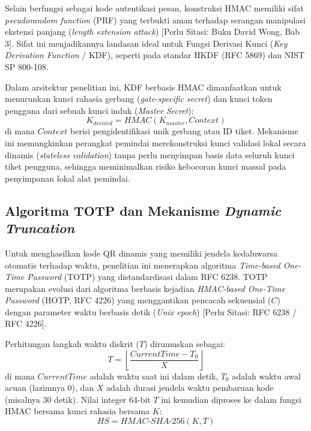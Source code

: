 Selain berfungsi sebagai kode autentikasi pesan, konstruksi HMAC memiliki sifat \textit{pseudorandom function} (PRF) yang terbukti aman terhadap serangan manipulasi ekstensi panjang (\textit{length extension attack}) [Perlu Sitasi: Buku David Wong, Bab 3]. Sifat ini menjadikannya landasan ideal untuk Fungsi Derivasi Kunci (\textit{Key Derivation Function} / KDF), seperti pada standar HKDF (RFC 5869) dan NIST SP 800-108.

Dalam arsitektur penelitian ini, KDF berbasis HMAC dimanfaatkan untuk menurunkan kunci rahasia gerbang (\textit{gate-specific secret}) dan kunci token pengguna dari sebuah kunci induk (\textit{Master Secret}):
\begin{equation}
    K_{derived} = HMAC(K_{master}, Context)
\end{equation}
di mana $Context$ berisi pengidentifikasi unik gerbang atau ID tiket. Mekanisme ini memungkinkan perangkat pemindai merekonstruksi kunci validasi lokal secara dinamis (\textit{stateless validation}) tanpa perlu menyimpan basis data seluruh kunci tiket pengguna, sehingga meminimalkan risiko kebocoran kunci massal pada penyimpanan lokal alat pemindai.

\subsection{Algoritma TOTP dan Mekanisme \textit{Dynamic Truncation}}
Untuk menghasilkan kode QR dinamis yang memiliki jendela kedaluwarsa otomatis terhadap waktu, penelitian ini menerapkan algoritma \textit{Time-based One-Time Password} (TOTP) yang distandardisasi dalam RFC 6238. TOTP merupakan evolusi dari algoritma berbasis kejadian \textit{HMAC-based One-Time Password} (HOTP, RFC 4226) yang menggantikan pencacah sekuensial ($C$) dengan parameter waktu berbasis detik (\textit{Unix epoch}) [Perlu Sitasi: RFC 6238 / RFC 4226].

Perhitungan langkah waktu diskrit ($T$) dirumuskan sebagai:
\begin{equation}
    T = \left\lfloor \frac{CurrentTime - T_0}{X} \right\rfloor
\end{equation}
di mana $CurrentTime$ adalah waktu saat ini dalam detik, $T_0$ adalah waktu awal acuan (lazimnya 0), dan $X$ adalah durasi jendela waktu pembaruan kode (misalnya 30 detik). Nilai integer 64-bit $T$ ini kemudian diproses ke dalam fungsi HMAC bersama kunci rahasia bersama $K$:
\begin{equation}
    HS = HMAC\text{-}SHA\text{-}256(K, T)
\end{equation}

